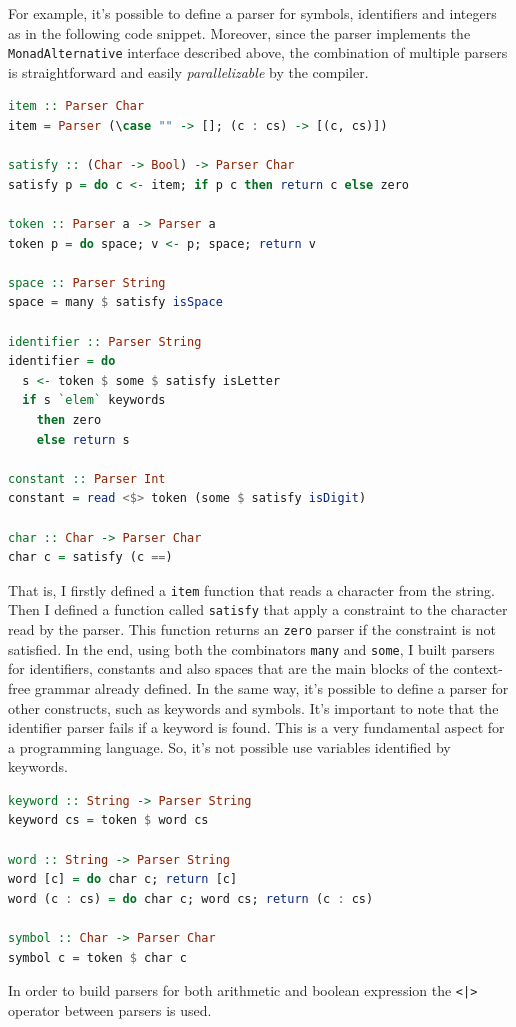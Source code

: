 \documentclass[12pt,a4paper]{article}
\begin{document}
For example, it's possible to define a parser for symbols, identifiers and integers as in the following code snippet.
Moreover, since the parser implements the \texttt{MonadAlternative} interface described above, the combination of multiple parsers is straightforward and easily \textit{parallelizable} by the compiler.
\begin{lstlisting}[language=Haskell, style=custom-style]
item :: Parser Char
item = Parser (\case "" -> []; (c : cs) -> [(c, cs)])

satisfy :: (Char -> Bool) -> Parser Char
satisfy p = do c <- item; if p c then return c else zero

token :: Parser a -> Parser a
token p = do space; v <- p; space; return v

space :: Parser String
space = many $ satisfy isSpace

identifier :: Parser String
identifier = do
  s <- token $ some $ satisfy isLetter
  if s `elem` keywords
    then zero
    else return s

constant :: Parser Int
constant = read <$> token (some $ satisfy isDigit)

char :: Char -> Parser Char
char c = satisfy (c ==)
\end{lstlisting}
That is, I firstly defined a \texttt{item} function that reads a character from the string.
Then I defined a function called \texttt{satisfy} that apply a constraint to the character read by the parser.
This function returns an \texttt{zero} parser if the constraint is not satisfied.
In the end, using both the combinators \texttt{many} and \texttt{some}, I built parsers for identifiers, constants and also spaces that are the main blocks of the context-free grammar already defined.
In the same way, it's possible to define a parser for other constructs, such as keywords and symbols.
It's important to note that the identifier parser fails if a keyword is found.
This is a very fundamental aspect for a programming language.
So, it's not possible use variables identified by keywords. \\
\begin{lstlisting}[language=Haskell, style=custom-style]
keyword :: String -> Parser String
keyword cs = token $ word cs

word :: String -> Parser String
word [c] = do char c; return [c]
word (c : cs) = do char c; word cs; return (c : cs)

symbol :: Char -> Parser Char
symbol c = token $ char c
\end{lstlisting}
In order to build parsers for both arithmetic and boolean expression the \texttt{<|>} operator between parsers is used.
\end{document}
